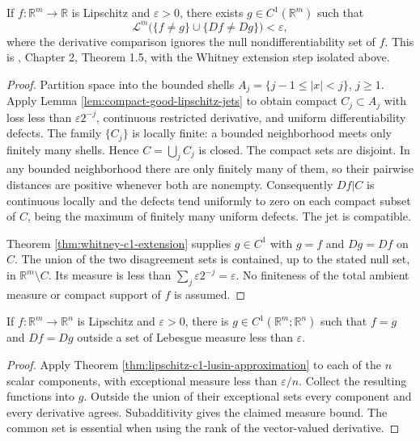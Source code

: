 \begin{theorem}\label{thm:lipschitz-c1-lusin-approximation}
If $f:\mathbb R^m\to\mathbb R$ is Lipschitz and $\varepsilon>0$, there exists $g\in C^1(\mathbb R^m)$ such that
\[
 \mathcal L^m\bigl(\{f\ne g\}\cup\{Df\ne Dg\}\bigr)<\varepsilon,
\]
where the derivative comparison ignores the null nondifferentiability set of $f$. This is \cite{Sim18}, Chapter 2, Theorem 1.5, with the Whitney extension step isolated above.
\end{theorem}
\begin{proof}
Partition space into the bounded shells $A_j=\{j-1\leq|x|<j\}$, $j\geq1$. Apply Lemma \ref{lem:compact-good-lipschitz-jets} to obtain compact $C_j\subset A_j$ with loss less than $\varepsilon 2^{-j}$, continuous restricted derivative, and uniform differentiability defects. The family $\{C_j\}$ is locally finite: a bounded neighborhood meets only finitely many shells. Hence $C=\bigcup_jC_j$ is closed. The compact sets are disjoint. In any bounded neighborhood there are only finitely many of them, so their pairwise distances are positive whenever both are nonempty. Consequently $Df|C$ is continuous locally and the defects tend uniformly to zero on each compact subset of $C$, being the maximum of finitely many uniform defects. The jet is compatible.

Theorem \ref{thm:whitney-c1-extension} supplies $g\in C^1$ with $g=f$ and $Dg=Df$ on $C$. The union of the two disagreement sets is contained, up to the stated null set, in $\mathbb R^m\setminus C$. Its measure is less than $\sum_j\varepsilon2^{-j}=\varepsilon$. No finiteness of the total ambient measure or compact support of $f$ is assumed.
\end{proof}

\begin{corollary}\label{cor:vector-c1-lusin-approximation}
If $f:\mathbb R^m\to\mathbb R^n$ is Lipschitz and $\varepsilon>0$, there is $g\in C^1(\mathbb R^m;\mathbb R^n)$ such that $f=g$ and $Df=Dg$ outside a set of Lebesgue measure less than $\varepsilon$.
\end{corollary}
\begin{proof}
Apply Theorem \ref{thm:lipschitz-c1-lusin-approximation} to each of the $n$ scalar components, with exceptional measure less than $\varepsilon/n$. Collect the resulting functions into $g$. Outside the union of their exceptional sets every component and every derivative agrees. Subadditivity gives the claimed measure bound. The common set is essential when using the rank of the vector-valued derivative.
\end{proof}

